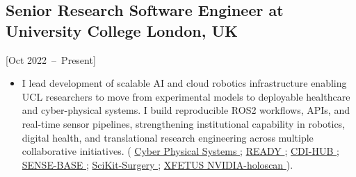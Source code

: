 \documentclass{mycv}
\begin{document}
\subsection{Senior Research Software Engineer at University College London, UK}[Oct 2022~--~Present]
\begin{itemize}
  \item
I lead development of scalable AI and cloud robotics infrastructure enabling UCL researchers to move from experimental models to deployable healthcare and cyber-physical systems.
I build reproducible ROS2 workflows, APIs, and real-time sensor pipelines, strengthening institutional capability in robotics, digital health, and translational research engineering across multiple collaborative initiatives.
(
\href{https://github.com/UCL-CyberPhysicalSystems/hackathon-01}{Cyber Physical Systems \faGithub*};
\href{https://github.com/oocular/ready}{READY \faGithub*};
\href{https://github.com/UCL-CDI/cdi-hub}{CDI-HUB \faGithub*};
\href{https://github.com/sense-base}{SENSE-BASE \faGithub*};
\href{https://github.com/SciKit-Surgery}{SciKit-Surgery \faGithub*};
\href{https://github.com/xfetus/xfetus}{XFETUS \faGithub*}
\href{https://mxochicale.github.io/real-time-ai-for-surgery-with-NVIDIA-Holoscan-platform/#/section}{NVIDIA-holoscan \faExternalLink*}
).
\end{itemize}
\end{document}
